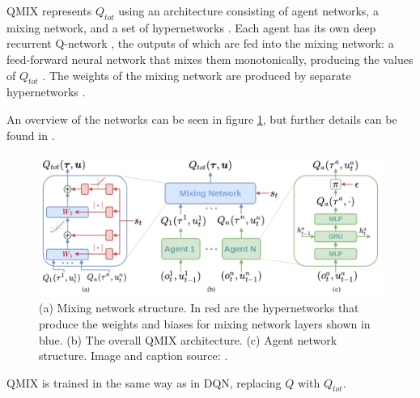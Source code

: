 QMIX represents $Q_{tot}$ using an architecture
consisting of agent networks, a mixing network, and a set
of hypernetworks \cite{hypernetworks} \cite{qmixcite}. Each agent has its own deep recurrent Q-network \cite{dqrn}, the outputs of which are fed into the mixing network: a feed-forward neural network that mixes them
monotonically, producing the values of $Q_{tot}$ \cite{qmixcite}. The weights of the mixing network are produced by separate hypernetworks \cite{qmixcite}.

An overview of the networks can be seen in figure \ref{fig:qmix}, but further details can be found in \cite{qmixcite}.

\begin{figure}
    \centering
    \hbox{\hspace{-2.5em}\includegraphics[scale = 0.18]{images/qmix.png}}
    \caption{(a) Mixing network structure. In red are the hypernetworks that produce the weights and biases for mixing network layers shown
in blue. (b) The overall QMIX architecture. (c) Agent network structure. Image and caption source: \cite{qmixcite}.}
    \label{fig:qmix}
\end{figure}





QMIX is trained in the same way as in DQN, replacing $Q$ with $Q_{tot}$.

